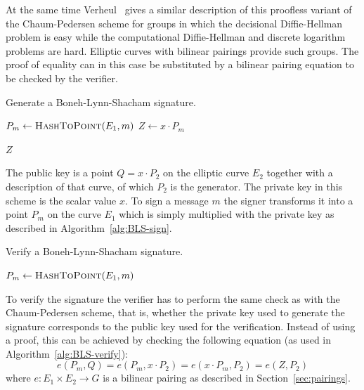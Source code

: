 At the same time Verheul~\cite{Verheul01} gives a similar description of this
proofless variant of the Chaum-Pedersen scheme for groups in which the
decisional Diffie-Hellman problem is easy while the computational Diffie-Hellman
and discrete logarithm problems are hard. Elliptic curves with bilinear pairings
provide such groups. The proof of equality can in this case be substituted by a
bilinear pairing equation to be checked by the verifier.

\begin{algorithm}[t]
  \caption{Generate a Boneh-Lynn-Shacham signature.}
  \label{alg:BLS-sign}
  \addtolength{\baselineskip}{1mm}
  \begin{algorithmic}[1]
      \State $P_m \gets \Call{HashToPoint}{E_1, m}$
      \State $Z \gets x \cdot P_m$

      \Return $Z$
    \EndFunction
  \end{algorithmic}
\end{algorithm}

The public key is a point $Q = x \cdot P_2$ on the elliptic curve $E_2$
together with a description of that curve, of which $P_2$ is the generator. The
private key in this scheme is the scalar value $x$. To sign a message $m$ the
signer transforms it into a point $P_m$ on the curve $E_1$ which is simply
multiplied with the private key as described in Algorithm~\ref{alg:BLS-sign}.

\begin{algorithm}
  \caption{Verify a Boneh-Lynn-Shacham signature.}
  \label{alg:BLS-verify}
  \addtolength{\baselineskip}{1mm}
  \begin{algorithmic}[1]
      \State $P_m \gets \Call{HashToPoint}{E_1, m}$
      \Return {}
      \EndIf

      \Return {}
    \EndFunction
  \end{algorithmic}
\end{algorithm}

To verify the signature the verifier has to perform the same check as with the
Chaum-Pedersen scheme, that is, whether the private key used to generate the
signature corresponds to the public key used for the verification. Instead of
using a proof, this can be achieved by checking the following equation (as used
in Algorithm~\ref{alg:BLS-verify}):
\begin{equation}\label{eqn:BLS-verify}
  e(P_m, Q) = e(P_m, x \cdot P_2) = e(x \cdot P_m, P_2) = e(Z, P_2)
\end{equation}
where $e: E_1 \times E_2 \to G$ is a bilinear pairing as described in
Section~\ref{sec:pairings}.

